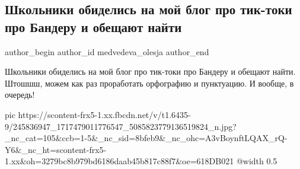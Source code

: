  
 
 
 
 
 
\subsection{Школьники обиделись на мой блог про тик-токи про Бандеру и обещают найти}
\label{sec:15_10_2021.fb.medvedeva_olesja.1.shkolniki_obida_bandera}
 
\ifcmt
 author_begin
   author_id medvedeva_olesja
 author_end
\fi

Школьники обиделись на мой блог про тик-токи про Бандеру и обещают найти.
Штошшш, можем как раз проработать орфографию и пунктуацию.  И вообще, в
очередь!

\ifcmt
  pic https://scontent-frx5-1.xx.fbcdn.net/v/t1.6435-9/245836947_1717479011776547_5085823779136519824_n.jpg?_nc_cat=105&ccb=1-5&_nc_sid=8bfeb9&_nc_ohc=A3vBoynftLQAX_rQ-Y6&_nc_ht=scontent-frx5-1.xx&oh=3279bc8b979bd6186daab45b817c88f7&oe=618DB021
  @width 0.5
\fi

